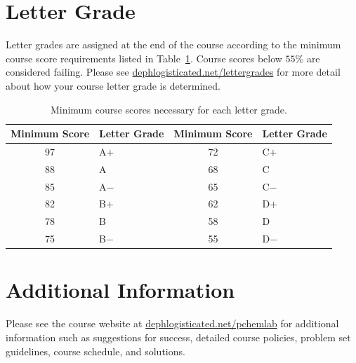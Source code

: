 \documentclass[letterpaper,oneside,onecolumn,11pt,article]{memoir}
\begin{document}
\section{Letter Grade}
Letter grades are assigned at the end of the course according to the minimum course score requirements listed in Table~\ref{tab:lettergrades}. Course scores below $55\%$ are considered failing. Please see \href{https://dephlogisticated.net/lettergrades}{dephlogisticated.net/lettergrades} for more detail about how your course letter grade is determined. 
\begin{table}[h]
\caption{\sffamily Minimum course scores necessary for each letter grade.}
\label{tab:lettergrades}
\begin{tabular}{cl||cl} \toprule
\textbf{Minimum Score} & \textbf{Letter Grade} & \textbf{Minimum Score} & \textbf{Letter Grade} \\ \hline
97 & \hspace{0.3in}A$+$ & 72 & \hspace{0.3in}C$+$ \\
88 & \hspace{0.3in}A & 68 & \hspace{0.3in}C \\
85 & \hspace{0.3in}A$-$ & 65 & \hspace{0.3in}C$-$ \\
82 & \hspace{0.3in}B$+$ & 62 & \hspace{0.3in}D$+$ \\
78 & \hspace{0.3in}B & 58 & \hspace{0.3in}D \\
75 & \hspace{0.3in}B$-$ & 55 & \hspace{0.3in}D$-$ \\
\bottomrule
\end{tabular}
\end{table}
%
%
\section{Additional Information}
Please see the course website at \href{https://dephlogisticated.net/pchemlab}{dephlogisticated.net/pchemlab} for additional information such as suggestions for success, detailed course policies, problem set guidelines, course schedule, and solutions. 
%
%
\end{document}
